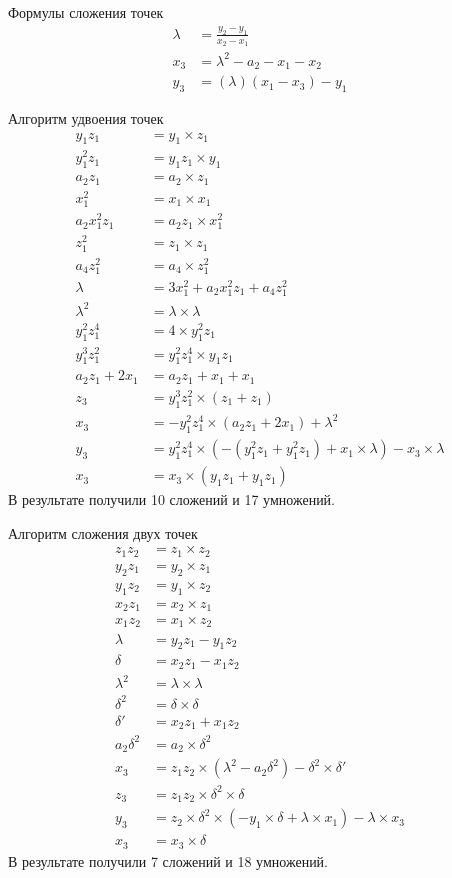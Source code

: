Формулы сложения точек
\begin{align*}
\lambda &= \frac{y_2 - y_1}{x_2 - x_1} \\
x_3 &= \lambda^2 - a_2 - x_1 - x_2 \\
y_3 &= (\lambda)(x_1 - x_3) - y_1
\end{align*}

Алгоритм удвоения точек
\begin{align*}
y_1z_1 &= y_1 \times z_1 \\
y_1^2z_1 &= y_1z_1 \times y_1 \\
a_2z_1 &= a_2 \times z_1 \\
x_1^2 &= x_1 \times x_1 \\
a_2x_1^2z_1 &= a_2z_1 \times x_1^2 \\
z_1^2 &= z_1 \times z_1 \\
a_4z_1^2 &= a_4 \times z_1^2 \\
\lambda &= 3x_1^2 + a_2x_1^2z_1 + a_4z_1^2 \\
\lambda^2 &= \lambda \times \lambda \\
y_1^2z_1^4 &= 4 \times y_1^2z_1 \\
y_1^3z_1^2 &= y_1^2z_1^4 \times y_1z_1 \\
a_2z_1 + 2x_1 &= a_2z_1 + x_1 + x_1 \\
z_3 &= y_1^3z_1^2 \times (z_1 + z_1) \\
x_3 &= -y_1^2z_1^4 \times (a_2z_1 + 2x_1) + \lambda^2 \\
y_3 &= y_1^2z_1^4 \times (-(y_1^2z_1 + y_1^2z_1) + x_1 \times \lambda) - x_3 \times \lambda \\
x_3 &= x_3 \times (y_1z_1 + y_1z_1)
\end{align*}
В результате получили 10 сложений и 17 умножений.

Алгоритм сложения двух точек
\begin{align*}
z_1z_2 &= z_1 \times z_2 \\
y_2z_1 &= y_2 \times z_1 \\
y_1z_2 &= y_1 \times z_2 \\
x_2z_1 &= x_2 \times z_1 \\
x_1z_2 &= x_1 \times z_2 \\
\lambda &= y_2z_1 - y_1z_2 \\
\delta &= x_2z_1 - x_1z_2 \\
\lambda^2 &= \lambda \times \lambda \\
\delta^2 &= \delta \times \delta \\
\delta' &= x_2z_1 + x_1z_2 \\
a_2\delta^2 &= a_2 \times \delta^2 \\
x_3 &= z_1z_2 \times (\lambda^2 - a_2\delta^2) - \delta^2 \times \delta' \\
z_3 &= z_1z_2 \times \delta^2 \times \delta \\
y_3 &= z_2 \times \delta^2 \times (-y_1 \times \delta + \lambda \times x_1) - \lambda \times x_3 \\
x_3 &= x_3 \times \delta
\end{align*}
В результате получили 7 сложений и 18 умножений.
